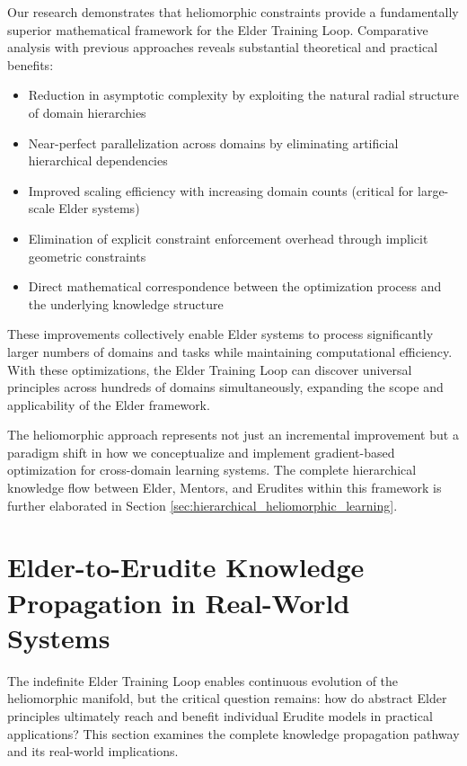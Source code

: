 Our research demonstrates that heliomorphic constraints provide a fundamentally superior mathematical framework for the Elder Training Loop. Comparative analysis with previous approaches reveals substantial theoretical and practical benefits:

\begin{itemize}
    \item Reduction in asymptotic complexity by exploiting the natural radial structure of domain hierarchies
    \item Near-perfect parallelization across domains by eliminating artificial hierarchical dependencies
    \item Improved scaling efficiency with increasing domain counts (critical for large-scale Elder systems)
    \item Elimination of explicit constraint enforcement overhead through implicit geometric constraints
    \item Direct mathematical correspondence between the optimization process and the underlying knowledge structure
\end{itemize}

These improvements collectively enable Elder systems to process significantly larger numbers of domains and tasks while maintaining computational efficiency. With these optimizations, the Elder Training Loop can discover universal principles across hundreds of domains simultaneously, expanding the scope and applicability of the Elder framework.

The heliomorphic approach represents not just an incremental improvement but a paradigm shift in how we conceptualize and implement gradient-based optimization for cross-domain learning systems. The complete hierarchical knowledge flow between Elder, Mentors, and Erudites within this framework is further elaborated in Section \ref{sec:hierarchical_heliomorphic_learning}.

\section{Elder-to-Erudite Knowledge Propagation in Real-World Systems}
\label{sec:elder_to_erudite}

The indefinite Elder Training Loop enables continuous evolution of the heliomorphic manifold, but the critical question remains: how do abstract Elder principles ultimately reach and benefit individual Erudite models in practical applications? This section examines the complete knowledge propagation pathway and its real-world implications.

